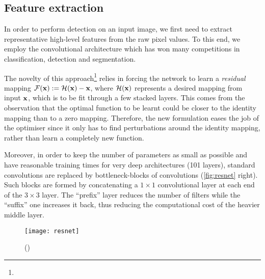 
	\subsection{Feature extraction}\label{sec:resnet}
		In order to perform detection on an input image, we first need to extract representative high-level features from the raw pixel values. To this end, we employ the \RESNET{} convolutional architecture which has won many competitions in classification, detection and segmentation.

		The novelty of this approach\footnote{} relies in forcing the network to learn a \emph{residual} mapping \(\mathcal{F}(\mathbf{x}) := \mathcal{H}(\mathbf{x}) - \mathbf{x}\), where \(\mathcal{H}(\mathbf{x})\) represents a desired mapping from input \(\mathbf{x}\), which is to be fit through a few stacked layers. This comes from the observation that the optimal function to be learnt could be closer to the identity mapping than to a zero mapping. Therefore, the new formulation eases the job of the optimiser since it only has to find perturbations around the identity mapping, rather than learn a completely new function.

		Moreover, in order to keep the number of parameters as small as possible and have reasonable training times for very deep architectures (101 layers), standard convolutions are replaced by bottleneck-blocks of convolutions (\autoref{fig:resnet} right). Such blocks are formed by concatenating a \(1 \times 1\) convolutional layer at each end of the \(3 \times 3\) layer. The ``prefix'' layer reduces the number of filters while the ``suffix'' one increases it back, thus reducing the computational cost of the heavier middle layer.

		\begin{figure}
			\texttt{[image: resnet]}
			\caption[ResNet blocks]{
				(\citet{resnet})
				\label{fig:resnet}
			}
		\end{figure}




